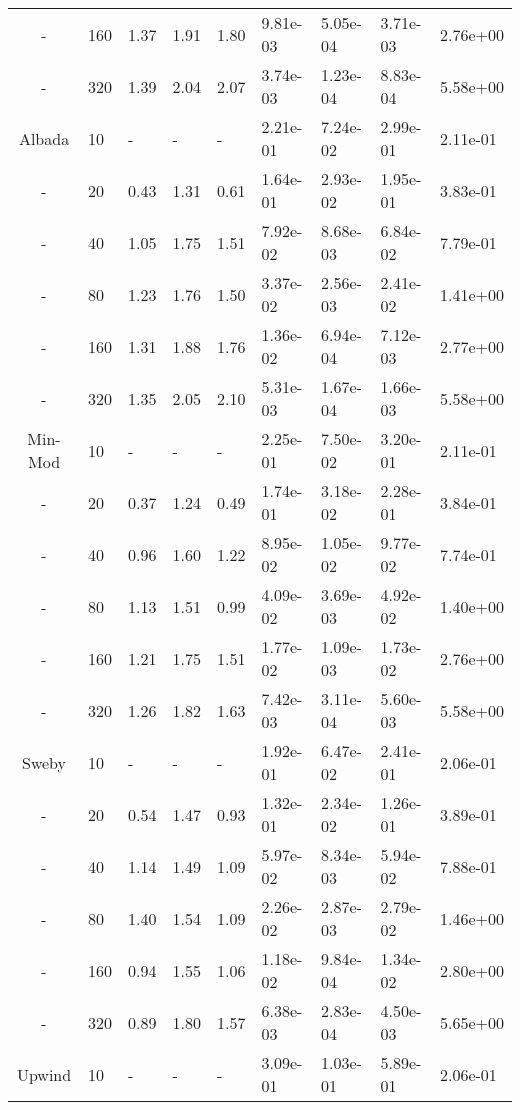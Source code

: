 \begin{table}[p]
{\begin{tabular}{cllllllll}
        - & 160 & 1.37 & 1.91 & 1.80 & 9.81e-03 & 5.05e-04 & 3.71e-03 & 2.76e+00 \\ 
        - & 320 & 1.39 & 2.04 & 2.07 & 3.74e-03 & 1.23e-04 & 8.83e-04 & 5.58e+00 \\ 
   \hline
     Albada &  10 & - & - & - & 2.21e-01 & 7.24e-02 & 2.99e-01 & 2.11e-01 \\ 
     - &  20 & 0.43 & 1.31 & 0.61 & 1.64e-01 & 2.93e-02 & 1.95e-01 & 3.83e-01 \\ 
     - &  40 & 1.05 & 1.75 & 1.51 & 7.92e-02 & 8.68e-03 & 6.84e-02 & 7.79e-01 \\ 
     - &  80 & 1.23 & 1.76 & 1.50 & 3.37e-02 & 2.56e-03 & 2.41e-02 & 1.41e+00 \\ 
     - & 160 & 1.31 & 1.88 & 1.76 & 1.36e-02 & 6.94e-04 & 7.12e-03 & 2.77e+00 \\ 
     - & 320 & 1.35 & 2.05 & 2.10 & 5.31e-03 & 1.67e-04 & 1.66e-03 & 5.58e+00 \\ 
   \hline
        Min-Mod &  10 & - & - & - & 2.25e-01 & 7.50e-02 & 3.20e-01 & 2.11e-01 \\ 
        - &  20 & 0.37 & 1.24 & 0.49 & 1.74e-01 & 3.18e-02 & 2.28e-01 & 3.84e-01 \\ 
        - &  40 & 0.96 & 1.60 & 1.22 & 8.95e-02 & 1.05e-02 & 9.77e-02 & 7.74e-01 \\ 
        - &  80 & 1.13 & 1.51 & 0.99 & 4.09e-02 & 3.69e-03 & 4.92e-02 & 1.40e+00 \\ 
        - & 160 & 1.21 & 1.75 & 1.51 & 1.77e-02 & 1.09e-03 & 1.73e-02 & 2.76e+00 \\ 
        - & 320 & 1.26 & 1.82 & 1.63 & 7.42e-03 & 3.11e-04 & 5.60e-03 & 5.58e+00 \\ 
   \hline
          Sweby &  10 & - & - & - & 1.92e-01 & 6.47e-02 & 2.41e-01 & 2.06e-01 \\ 
          - &  20 & 0.54 & 1.47 & 0.93 & 1.32e-01 & 2.34e-02 & 1.26e-01 & 3.89e-01 \\ 
          - &  40 & 1.14 & 1.49 & 1.09 & 5.97e-02 & 8.34e-03 & 5.94e-02 & 7.88e-01 \\ 
          - &  80 & 1.40 & 1.54 & 1.09 & 2.26e-02 & 2.87e-03 & 2.79e-02 & 1.46e+00 \\ 
          - & 160 & 0.94 & 1.55 & 1.06 & 1.18e-02 & 9.84e-04 & 1.34e-02 & 2.80e+00 \\ 
          - & 320 & 0.89 & 1.80 & 1.57 & 6.38e-03 & 2.83e-04 & 4.50e-03 & 5.65e+00 \\ 
   \hline
         Upwind &  10 & - & - & - & 3.09e-01 & 1.03e-01 & 5.89e-01 & 2.06e-01 \\ 

\end{tabular}}
\end{table}
